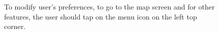\documentclass[12pt,titlepage]{article}
\begin{document}
\begin{figure}
\centering
{}
\caption{To modify user's preferences, to go to the map screen and for other features, the user should tap on the menu icon on the left top corner.}
\end{figure}
\end{document}
